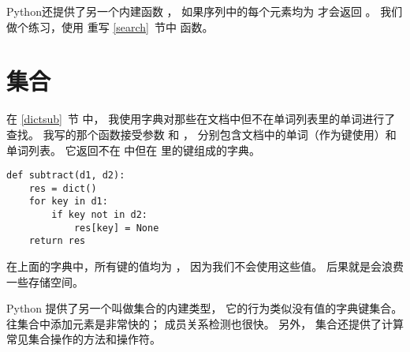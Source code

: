 Python还提供了另一个内建函数 ， 如果序列中的每个元素均为  才会返回  。 我们做个练习，使用  重写 \ref{search}~节中  函数。



\section{集合}
\label{sets}


在 \ref{dictsub}~节 中， 我使用字典对那些在文档中但不在单词列表里的单词进行了查找。  
我写的那个函数接受参数  和  ， 分别包含文档中的单词（作为键使用）和单词列表。  
它返回不在  中但在  里的键组成的字典。

\begin{lstlisting}
def subtract(d1, d2):
    res = dict()
    for key in d1:
        if key not in d2:
            res[key] = None
    return res
\end{lstlisting}


在上面的字典中，所有键的值均为  ， 因为我们不会使用这些值。  后果就是会浪费一些存储空间。


Python 提供了另一个叫做集合的内建类型， 它的行为类似没有值的字典键集合。  
往集合中添加元素是非常快的； 成员关系检测也很快。 
另外， 集合还提供了计算常见集合操作的方法和操作符。


